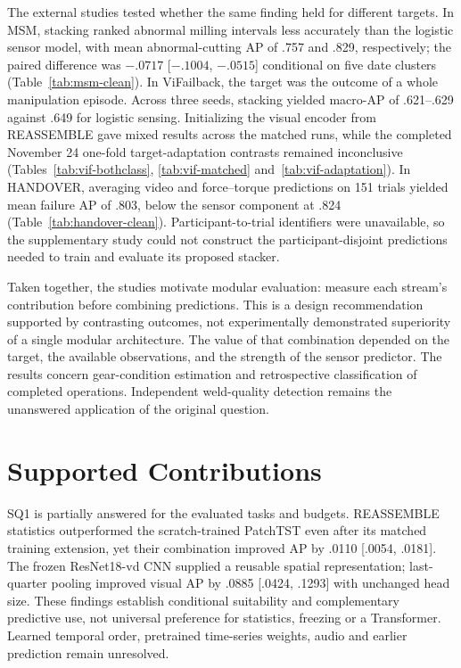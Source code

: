 The external studies tested whether the same finding held for different targets. In MSM,
stacking ranked abnormal milling intervals less accurately than the logistic sensor
model, with mean abnormal-cutting AP of .757 and .829, respectively; the paired
difference was $-.0717$ [$-.1004$, $-.0515$] conditional on five date clusters
(Table~\ref{tab:msm-clean}). In ViFailback, the target was the outcome of a whole
manipulation episode. Across three seeds, stacking yielded macro-AP of .621--.629
against .649 for logistic sensing. Initializing the visual encoder from REASSEMBLE gave
mixed results across the matched runs, while the completed November 24 one-fold
target-adaptation contrasts remained inconclusive (Tables~\ref{tab:vif-bothclass},
\ref{tab:vif-matched} and~\ref{tab:vif-adaptation}). In HANDOVER, averaging video and
force--torque predictions on 151 trials yielded mean failure AP of .803, below the
sensor component at .824 (Table~\ref{tab:handover-clean}). Participant-to-trial
identifiers were unavailable, so the supplementary study could not construct the
participant-disjoint predictions needed to train and evaluate its proposed stacker.

Taken together, the studies motivate modular evaluation: measure each stream's
contribution before combining predictions. This is a design recommendation supported by
contrasting outcomes, not experimentally demonstrated superiority of a single modular
architecture. The value of that combination depended on the target, the available
observations, and the strength of the sensor predictor. The results concern
gear-condition estimation and retrospective classification of completed operations.
Independent weld-quality detection remains the unanswered application of the original
question.

\section{Supported Contributions}
SQ1 is partially answered for the evaluated tasks and budgets. REASSEMBLE statistics
outperformed the scratch-trained PatchTST even after its matched training extension, yet
their combination improved AP by .0110 [.0054, .0181]. The frozen ResNet18-vd CNN
supplied a reusable spatial representation; last-quarter pooling improved visual AP by
.0885 [.0424, .1293] with unchanged head size. These findings establish conditional
suitability and complementary predictive use, not universal preference for statistics,
freezing or a Transformer. Learned temporal order, pretrained time-series weights, audio
and earlier prediction remain unresolved.

